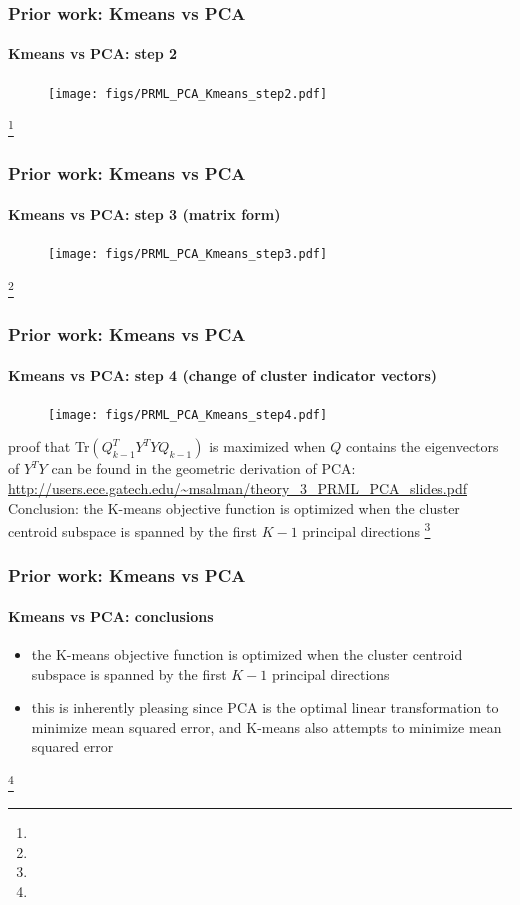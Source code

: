 \begin{frame}[plain]
\frametitle{Prior work: Kmeans vs PCA}
\framesubtitle{Kmeans vs PCA: step 2}
\mypagenum
	\begin{changemargin}{-1.35in}{0in}
		\begin{figure}
			\texttt{[image: figs/PRML\_PCA\_Kmeans\_step2.pdf]}
		\end{figure}
	\end{changemargin}
\footnote{\tiny {}}
\end{frame}



\begin{frame}[plain]
\frametitle{Prior work: Kmeans vs PCA}
\framesubtitle{Kmeans vs PCA: step 3 (matrix form)}
\mypagenum
	\begin{changemargin}{-1.35in}{0in}
		\begin{figure}
			\texttt{[image: figs/PRML\_PCA\_Kmeans\_step3.pdf]}
		\end{figure}
	\end{changemargin}
\footnote{\tiny {}}
\end{frame}


\begin{frame}
\frametitle{Prior work: Kmeans vs PCA}
\framesubtitle{Kmeans vs PCA: step 4 (change of cluster indicator vectors)}
\mypagenum
	\begin{figure}
		\texttt{[image: figs/PRML\_PCA\_Kmeans\_step4.pdf]}
	\end{figure}
	{\tiny proof that Tr$(Q_{k-1}^TY^TYQ_{k-1})$ is maximized when $Q$ contains the eigenvectors of $Y^TY$ can be found in the geometric derivation of PCA: {\color{blue}  \href{http://users.ece.gatech.edu/~msalman/theory_3_PRML_PCA_slides.pdf}{http://users.ece.gatech.edu/\textasciitilde msalman/theory\_3\_PRML\_PCA\_slides.pdf}}}\\
	{\color{red} Conclusion}: the K-means objective function is optimized when the cluster centroid subspace is spanned by the first $K-1$ principal directions
\footnote{\tiny {}}
\end{frame}


\begin{frame}
\frametitle{Prior work: Kmeans vs PCA}
\framesubtitle{Kmeans vs PCA: conclusions}
\mypagenum
	\begin{itemize}
		\item the K-means objective function is optimized when the cluster centroid subspace is spanned by the first $K-1$ principal directions
		\item this is inherently pleasing since PCA is the optimal linear transformation to minimize mean squared error, and K-means also attempts to minimize mean squared error
	\end{itemize}
\footnote{\tiny {}}
\end{frame}


